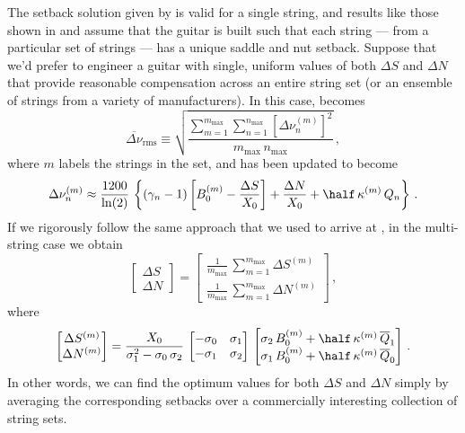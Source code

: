 The setback solution given by  is valid for a single string, and results like those shown in  and  assume that the guitar is built such that each string --- from a particular set of strings --- has a unique saddle and nut setback. Suppose that we'd prefer to engineer a guitar with single, uniform values of both $\Delta S$ and $\Delta N$ that provide reasonable compensation across an entire string set (or an ensemble of strings from a variety of manufacturers). In this case,  becomes
 \begin{equation}\label{eqn:rms_def_m}
\overline{\Delta \nu}_\text{rms} \equiv \sqrt{\frac{\sum_{m = 1}^{m_\text{max}} \sum_{n = 1}^{n_\text{max}} \left[\Delta \nu^{(m)}_{n}\right]^2}{m_\text{max}\, n_\text{max}}}\, ,
 \end{equation}
where $m$ labels the strings in the set, and  has been updated to become
 \begin{equation}\label{eqn:error_tot_m}
\Delta \nu^{(m)}_n \approx \frac{1200}{\ln(2)}\, \left\{ \left(\gamma_n - 1\right) \left[B_0^{(m)} - \frac{\Delta S}{X_0}\right] + \frac{\Delta N}{X_0} + \half\, \kappa^{(m)}\, Q_n \right\}\, .
 \end{equation}
If we rigorously follow the same approach that we used to arrive at , in the multi-string case we obtain
 \begin{equation}\label{eqn:rms_sol_multi}
\begin{bmatrix}
  \Delta S \\
  \Delta N
\end{bmatrix} =
\begin{bmatrix}
  \frac{1}{m_\text{max}}\, \sum_{m = 1}^{m_\text{max}} \Delta S^{(m)} \\
  \frac{1}{m_\text{max}}\, \sum_{m = 1}^{m_\text{max}} \Delta N^{(m)}
\end{bmatrix}\, ,
 \end{equation}
where
 \begin{equation}\label{eqn:rms_sol_uni}
\begin{bmatrix}
  \Delta S^{(m)} \\
  \Delta N^{(m)}
\end{bmatrix} = \frac{X_0}{\sigma_1^2 - \sigma_0\, \sigma_2}\,
\begin{bmatrix}
  -\sigma_0 & \sigma_1 \\
  -\sigma_1 & \sigma_2
\end{bmatrix}\,
\begin{bmatrix}
  \sigma_2\, B_0^{(m)} + \half\, \kappa^{(m)}\, \overline{Q}_1 \\
  \sigma_1\, B_0^{(m)} + \half\, \kappa^{(m)}\, \overline{Q}_0
\end{bmatrix}\, .
 \end{equation}
In other words, we can find the optimum values for both $\Delta S$ and $\Delta N$ simply by averaging the corresponding setbacks over a commercially interesting collection of string sets. 